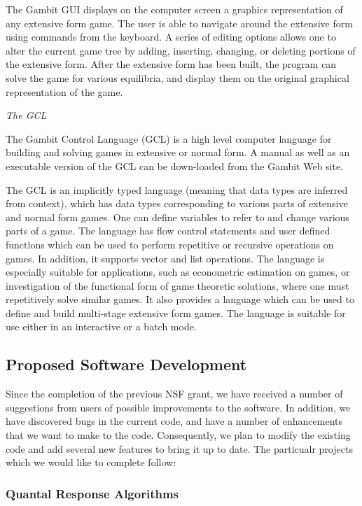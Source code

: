 \documentclass[12pt]{article}
\begin{document}
The Gambit GUI displays on the computer screen a graphics representation
of any extensive form game.  The user is able to navigate around the
extensive form using commands from the keyboard.  A series of editing
options allows one to alter the current game tree by adding, inserting,
changing, or deleting portions of the extensive form.  After the extensive
form has been built, the program can solve the game for various
equilibria, and display them on the original graphical representation of
the game.  

\bigskip
\noindent
{\em The GCL}

\smallskip
\noindent
The Gambit Control Language (GCL) is a high level computer language for
building and solving games in extensive or normal form.   A manual as
well as an executable version of the GCL can be down-loaded from the
Gambit Web site.  

The GCL is an implicitly typed language (meaning that data types are
inferred from context), which has data types corresponding to various
parts of extensive and normal form games.  One can define variables to
refer to and change various parts of a game.  The language has flow
control statements and user defined functions which can be used to
perform repetitive or recursive operations on games.  In addition, it
supports vector and list operations. The language is especially
suitable for applications, such as econometric estimation on games, or
investigation of the functional form of game theoretic solutions,
where one must repetitively solve similar games.  It also provides a
language which can be used to define and build multi-stage extensive
form games.  The language is suitable for use either in an interactive
or a batch mode.

\subsection{Proposed Software Development}

Since the completion of the previous NSF grant, we have received a
number of suggestions from users of possible improvements to the
software.  In addition, we have discovered bugs in the current code,
and have a number of enhancements that we want to make to the code.
Consequently, we plan to modify the existing code and add several new
features to bring it up to date.  The particualr projects which we
would like to complete follow:

\subsubsection{Quantal Response Algorithms} 
\end{document}
